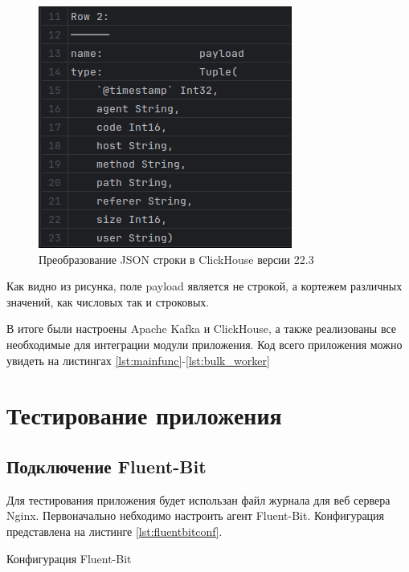 \documentclass[14pt, russian]{scrartcl}
\begin{document}
\begin{figure}[H]
	\centering
	\begin{minipage}[t]{.7\textwidth}
		\centering
		\includegraphics[width=.6\textwidth]{./imgs/descres1.png}
	\end{minipage}
	\caption{Преобразование JSON строки в ClickHouse версии 22.3}
	\label{fig:descres}
\end{figure}

Как видно из рисунка, поле payload является не строкой,
а кортежем различных значений, как числовых так и строковых.


В итоге были настроены Apache Kafka и ClickHouse, а также
реализованы все необходимые для интеграции
модули приложения. Код всего приложения можно увидеть на листингах \ref{lst:mainfunc}-\ref{lst:bulk_worker}


\section{Тестирование приложения}

\subsection{Подключение Fluent-Bit}

Для тестирования приложения будет
использан файл журнала для веб сервера Nginx.
Первоначально небходимо настроить агент Fluent-Bit. Конфигурация
представлена на листинге \ref{lst:fluentbitconf}.

\begin{listing}[H]
	\caption{Конфигурация Fluent-Bit}
	\label{lst:fluentbitconf}
	\inputminted[style=bw, frame=single,fontsize = \footnotesize, linenos=false, xleftmargin = 1.5em]{sql}{./listings/fluent-bit.conf}
\end{listing}
\end{document}
